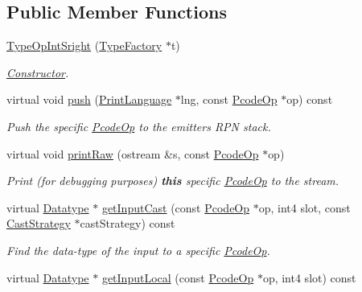 \subsection*{Public Member Functions}
\begin{DoxyCompactItemize}
\item 
\mbox{\hyperlink{class_type_op_int_sright_a4cdfaed7d47ff6c9ee54ac39dca861dd}{Type\+Op\+Int\+Sright}} (\mbox{\hyperlink{class_type_factory}{Type\+Factory}} $\ast$t)
\begin{DoxyCompactList}\small\item\em \mbox{\hyperlink{class_constructor}{Constructor}}. \end{DoxyCompactList}\item 
virtual void \mbox{\hyperlink{class_type_op_int_sright_afb421e7659a24ce65a7680a1ac4e8592}{push}} (\mbox{\hyperlink{class_print_language}{Print\+Language}} $\ast$lng, const \mbox{\hyperlink{class_pcode_op}{Pcode\+Op}} $\ast$op) const
\begin{DoxyCompactList}\small\item\em Push the specific \mbox{\hyperlink{class_pcode_op}{Pcode\+Op}} to the emitter\textquotesingle{}s R\+PN stack. \end{DoxyCompactList}\item 
virtual void \mbox{\hyperlink{class_type_op_int_sright_a1559e48c6d810e3c092f3b9957528ec8}{print\+Raw}} (ostream \&s, const \mbox{\hyperlink{class_pcode_op}{Pcode\+Op}} $\ast$op)
\begin{DoxyCompactList}\small\item\em Print (for debugging purposes) {\bfseries{this}} specific \mbox{\hyperlink{class_pcode_op}{Pcode\+Op}} to the stream. \end{DoxyCompactList}\item 
virtual \mbox{\hyperlink{class_datatype}{Datatype}} $\ast$ \mbox{\hyperlink{class_type_op_int_sright_aa7d3a668c673ad21f266ac14b3a5f417}{get\+Input\+Cast}} (const \mbox{\hyperlink{class_pcode_op}{Pcode\+Op}} $\ast$op, int4 slot, const \mbox{\hyperlink{class_cast_strategy}{Cast\+Strategy}} $\ast$cast\+Strategy) const
\begin{DoxyCompactList}\small\item\em Find the data-\/type of the input to a specific \mbox{\hyperlink{class_pcode_op}{Pcode\+Op}}. \end{DoxyCompactList}\item 
virtual \mbox{\hyperlink{class_datatype}{Datatype}} $\ast$ \mbox{\hyperlink{class_type_op_int_sright_a684bdbbed1aa1ac2fc0d08caf5e0ca24}{get\+Input\+Local}} (const \mbox{\hyperlink{class_pcode_op}{Pcode\+Op}} $\ast$op, int4 slot) const

\end{DoxyCompactItemize}
